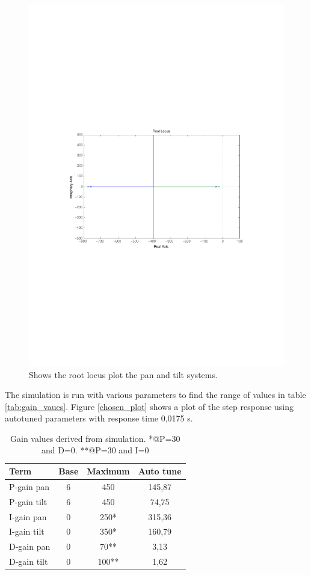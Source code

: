 \begin{figure}[htb]
	\centering
	\includegraphics[width=\textwidth,trim=0 270 0 270]{graphics/rlocus_plot.pdf} %
	\caption{Shows the root locus plot the pan and tilt systems.}
	\label{fig:rlocus_plot}			
\end{figure}

The simulation is run with various parameters to find the range of values in table \ref{tab:gain_vaues}. Figure \ref{chosen_plot} shows a plot of the step response using autotuned parameters with response time 0,0175 s.

\begin{table}[htb]				
	\centering
	\begin{tabular}{lccc}			
	Term & Base & Maximum & Auto tune \\			
	\midrule												
P-gain pan& 6 & 450 & 145,87\\
P-gain tilt& 6 & 450 & 74,75 \\
I-gain pan& 0 & 250* & 315,36  \\
I-gain tilt& 0 & 350* & 160,79 \\
D-gain pan& 0 & 70** & 3,13 \\
D-gain tilt& 0 & 100** & 1,62\\
	\end{tabular}
	\caption{Gain values derived from simulation. *@P=30 and D=0. **@P=30 and I=0}				
	\label{tab:gain_values}			
\end{table}

